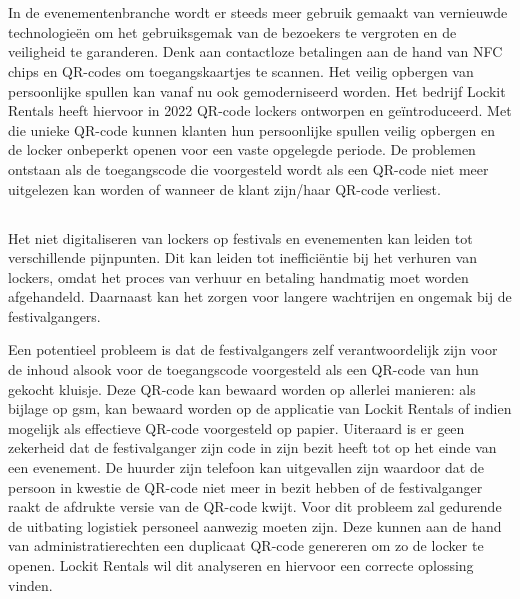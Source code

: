 
\chapter{}%
\label{ch:inleiding}

In de evenementenbranche wordt er steeds meer gebruik gemaakt van vernieuwde technologieën om het gebruiksgemak van de bezoekers te vergroten en de veiligheid te garanderen. Denk aan contactloze betalingen aan de hand van NFC chips en QR-codes om toegangskaartjes te scannen. Het veilig opbergen van persoonlijke spullen kan vanaf nu ook gemoderniseerd worden. Het bedrijf Lockit Rentals heeft hiervoor in 2022 QR-code lockers ontworpen en geïntroduceerd. Met die unieke QR-code kunnen klanten hun persoonlijke spullen veilig opbergen en de locker onbeperkt openen voor een vaste opgelegde periode. De problemen ontstaan als de toegangscode die voorgesteld wordt als een QR-code niet meer uitgelezen kan worden of wanneer de klant zijn/haar QR-code verliest. 

\newpage

\section{}%
\label{sec:probleemstelling}

Het niet digitaliseren van lockers op festivals en evenementen kan leiden tot verschillende pijnpunten. Dit kan leiden tot inefficiëntie bij het verhuren van lockers, omdat het proces van verhuur en betaling handmatig moet worden afgehandeld. Daarnaast kan het zorgen voor langere wachtrijen en ongemak bij de festivalgangers. 

Een potentieel probleem is dat de festivalgangers zelf verantwoordelijk zijn voor de inhoud alsook voor de toegangscode voorgesteld als een QR-code van hun gekocht kluisje. Deze QR-code kan bewaard worden op allerlei manieren: als bijlage op gsm, kan bewaard worden op de applicatie van Lockit Rentals of indien mogelijk als effectieve QR-code voorgesteld op papier. Uiteraard is er geen zekerheid dat de festivalganger zijn code in zijn bezit heeft tot op het einde van een evenement. De huurder zijn telefoon kan uitgevallen zijn waardoor dat de persoon in kwestie de QR-code niet meer in bezit hebben of de festivalganger raakt de afdrukte versie van de QR-code kwijt. Voor dit probleem zal gedurende de uitbating logistiek personeel aanwezig moeten zijn. Deze kunnen aan de hand van administratierechten een duplicaat QR-code genereren om zo de locker te openen. Lockit Rentals wil dit analyseren en hiervoor een correcte oplossing vinden. 

